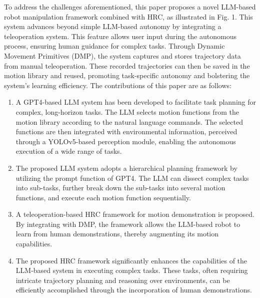 \documentclass[letterpaper,conference]{ieeeconf}
\begin{document}
To address the challenges aforementioned, this paper proposes a novel LLM-based robot manipulation framework combined with HRC, as illustrated in Fig. 1. 
This system advances beyond simple LLM-based autonomy by integrating a teleoperation system. This feature allows user input during the autonomous process, ensuring human guidance for complex tasks. Through Dynamic Movement Primitives (DMP), the system captures and stores trajectory data from manual teleoperation. These recorded trajectories can then be saved in the motion library and reused, promoting task-specific autonomy and bolstering the system's learning efficiency.
The contributions of this paper are as follows:
\begin{enumerate}
\item A GPT4-based LLM system has been developed to facilitate task planning for complex, long-horizon tasks. The LLM selects motion functions from the motion library according to the natural language commands. The selected functions are then integrated with environmental information, perceived through a YOLOv5-based perception module, enabling the autonomous execution of a wide range of tasks.
\item The proposed LLM system adopts a hierarchical planning framework by utilizing the prompt function of GPT4.
The LLM can dissect complex tasks into sub-tasks, further break down the sub-tasks into several motion functions, and execute each motion function sequentially.
\item A teleoperation-based HRC framework for motion demonstration is proposed. By integrating with DMP, the framework allows the LLM-based robot to learn from human demonstrations, thereby augmenting its motion capabilities.
\item The proposed HRC framework significantly enhances the capabilities of the LLM-based system in executing complex tasks. 
These tasks, often requiring intricate trajectory planning and reasoning over environments, can be efficiently accomplished through the incorporation of human demonstrations.
\end{enumerate}
 

 
\end{document}
